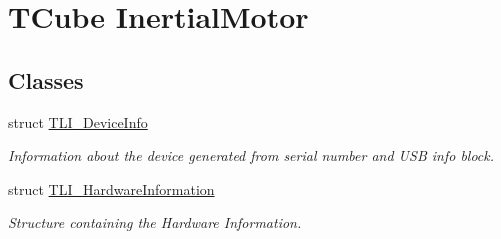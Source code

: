 \hypertarget{group___t_cube_inertial_motor}{}\section{T\+Cube Inertial\+Motor}
\label{group___t_cube_inertial_motor}
\subsection*{Classes}
\begin{DoxyCompactItemize}
\item 
struct \hyperlink{struct_t_l_i___device_info}{T\+L\+I\+\_\+\+Device\+Info}
\begin{DoxyCompactList}\small\item\em Information about the device generated from serial number and U\+SB info block. \end{DoxyCompactList}\item 
struct \hyperlink{struct_t_l_i___hardware_information}{T\+L\+I\+\_\+\+Hardware\+Information}
\begin{DoxyCompactList}\small\item\em Structure containing the Hardware Information. \end{DoxyCompactList}\end{DoxyCompactItemize}
